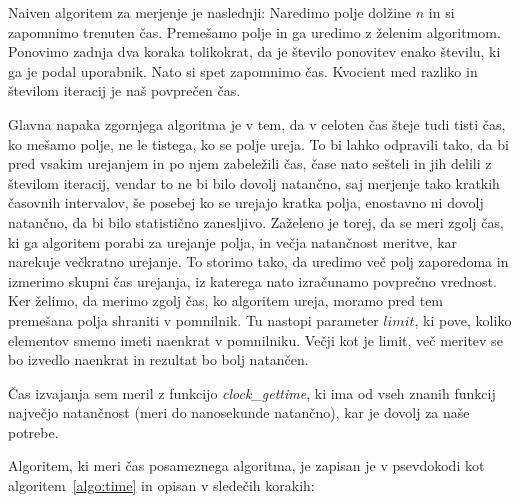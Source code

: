 \documentclass[a4paper,oneside,12pt]{article}
\begin{document}
Naiven algoritem za merjenje je naslednji:                                 
Naredimo polje dolžine $n$ in si zapomnimo trenuten čas. Premešamo polje in ga
uredimo z želenim algoritmom. Ponovimo zadnja dva koraka tolikokrat, da je število
ponovitev enako številu, ki ga je podal uporabnik. Nato si spet zapomnimo čas. Kvocient
med razliko in številom iteracij je naš povprečen čas.

Glavna napaka zgornjega algoritma je v tem, da v celoten čas šteje tudi tisti čas, ko
mešamo polje, ne le tistega, ko se polje ureja. To bi lahko odpravili tako, da bi pred
vsakim urejanjem in po njem zabeležili čas, čase nato sešteli in jih delili z številom iteracij,
vendar to ne bi bilo dovolj natančno, saj merjenje tako kratkih časovnih intervalov,
še posebej ko se urejajo kratka polja, enostavno ni dovolj natančno, da bi bilo
statistično zanesljivo. Zaželeno je torej, da se meri zgolj čas, ki ga algoritem porabi za
urejanje polja, in večja natančnost meritve, kar narekuje večkratno urejanje. To storimo
tako, da uredimo več polj zaporedoma in izmerimo skupni čas urejanja, iz katerega nato
izračunamo povprečno
vrednost. Ker želimo, da merimo zgolj čas, ko algoritem ureja, moramo pred tem 
premešana polja shraniti v pomnilnik. Tu nastopi parameter $limit$, ki pove, koliko
elementov smemo imeti naenkrat v pomnilniku. Večji kot je limit, več meritev se bo izvedlo naenkrat
in rezultat bo bolj natančen.

Čas izvajanja sem meril z funkcijo \emph{clock\_gettime}, ki ima od vseh znanih
funkcij največjo natančnost (meri do nanosekunde natančno), kar je dovolj
za naše potrebe.

Algoritem, ki meri čas posameznega algoritma, je zapisan je v psevdokodi kot
algoritem~\ref{algo:time} in opisan v sledečih korakih:
\end{document}
